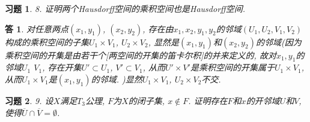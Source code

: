 \documentclass{ctexart}%
\newtheorem*{exercise}{习题}
\newtheorem*{solution}{答}
\theoremstyle{definition}
\theoremstyle{remark}
\begin{document}
\begin{exercise}8. 证明两个Hausdorff空间的乘积空间也是Hausdorff空间.
\end{exercise}
\begin{solution}对任意两点$(x_1,y_1)$, $(x_2,y_2)$, 存在由$x_1,x_2,y_1,y_2$的邻域$(U_1,U_2,V_1,V_2)$构成的乘积空间的子集$U_1\times V_1$, $U_2\times V_2$, 显然是$(x_1,y_1)$和$(x_2,y_2)$的邻域(因为乘积空间的开集是由若干个[两空间的开集的笛卡尔积]的并来定义的, 故对$x_1,y_1$的邻域$U_1$ $V_1$, 存在开集$U'\subset U_1$, $V'\subset V_1$, 从而$U'\times V'$是乘积空间的开集属于$U_1\times V_1$, 从而$U_1\times V_1$是$(x_1,y_1)$的邻域. )显然$U_1\times V_1$, $U_2\times V_2$不交. 
\end{solution}

\begin{exercise}9. 设$X$满足$T_3$公理, $F$为$X$的闭子集, $x\notin F$. 证明存在$F$和$x$的开邻域$U$和$V$, 使得$\overline{U}\cap\overline{V}=\emptyset$.
\end{exercise}
\end{document}
